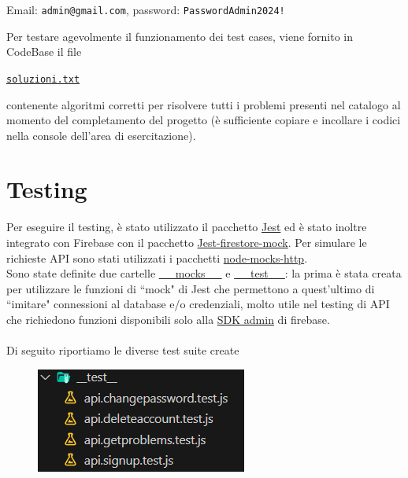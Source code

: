 \documentclass[11pt, a4paper]{article}
\theoremstyle{definition}
\begin{document}
\begin{center}
  Email: \texttt{admin@gmail.com}, password: \texttt{PasswordAdmin2024!}
\end{center}
Per testare agevolmente il funzionamento dei test cases, viene fornito
in CodeBase il file
\begin{center}
  \href{https://github.com/G17-UniTn/CodeBase/blob/master/SOLUZIONI.txt}{\texttt{soluzioni.txt}}
\end{center}
contenente algoritmi corretti per risolvere tutti i problemi
presenti nel catalogo al momento del completamento del progetto (è sufficiente
copiare e incollare i codici nella console dell'area di esercitazione).


\newpage
\section{Testing}
Per eseguire il testing, è stato utilizzato il pacchetto \href{https://jestjs.io/}{Jest} ed è stato inoltre integrato con Firebase con il pacchetto \href{https://www.npmjs.com/package/firestore-jest-mock}{Jest-firestore-mock}. Per simulare le richieste API sono stati
utilizzati i pacchetti \href{https://www.npmjs.com/package/node-mocks-http}{node-mocks-http}.\\
Sono state definite due cartelle \href{https://github.com/G17-UniTn/CodeBase/tree/master/__mocks__}{\_\_mocks\_\_} e \href{https://github.com/G17-UniTn/CodeBase/tree/master/__test__}{\_\_test\_\_}: la prima è stata creata per utilizzare le funzioni di ``mock" di Jest 
che permettono a quest'ultimo di ``imitare" connessioni al database e/o credenziali, molto utile nel testing di API che richiedono funzioni disponibili solo alla \href{https://firebase.google.com/docs/reference/admin}{SDK admin} di firebase.
\\\\
Di seguito riportiamo le diverse test suite create

\begin{figure}[H]
  \centering
  \includegraphics[scale = 1]{materiale/testing/test-overview.png}
\end{figure}
\end{document}
